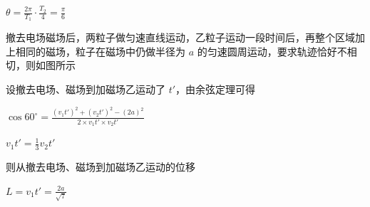 \documentclass[\gkver]{gaokaozhenti}
\begin{document}
\begin{enumerate}
{$\theta=\frac{2\pi}{T_1}\cdot\frac{T_2}{4}=\frac{\pi}{6}$

撤去电场磁场后，两粒子做匀速直线运动，乙粒子运动一段时间后，再整个区域加上相同的磁场，粒子在磁场中仍做半径为 $a$ 的匀速圆周运动，要求轨迹恰好不相切，则如图所示


设撤去电场、磁场到加磁场乙运动了 $t'$，由余弦定理可得

$\cos60^\circ=\frac{(v_1t')^2+(v_2t')^2-(2a)^2}{2\times v_1t'\times v_2t'}$

$v_1t'=\frac{1}{3}v_2t'$

则从撤去电场、磁场到加磁场乙运动的位移

$L=v_1t'=\frac{2a}{\sqrt{7}}$
}

\end{enumerate}
\end{document}
